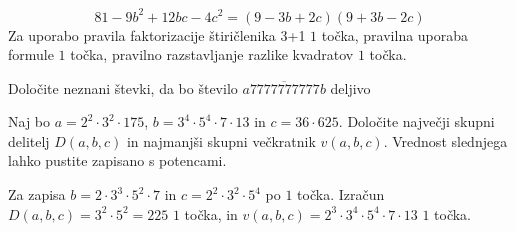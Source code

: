 \documentclass[addpoints]{exam}
\begin{document}
\begin{questions}
\begin{parts}
        \begin{solution}[3cm]
            $$81-9b^2+12bc-4c^2=(9-3b+2c)(9+3b-2c)$$
            Za uporabo pravila faktorizacije štiričlenika 3+1 $1$ točka, pravilna uporaba formule $1$ točka, pravilno razstavljanje razlike kvadratov $1$ točka.
        \end{solution}


    \end{parts}



    \question
    Določite neznani števki, da bo število $\overline{a7777777777b}$ deljivo




    \question[4]
    Naj bo $a=2^2\cdot 3^2\cdot 175$, $b=3^4\cdot 5^4\cdot 7\cdot 13$ in $c=36\cdot 625$. 
    Določite največji skupni delitelj $D(a,b,c)$ in najmanjši skupni večkratnik $v(a,b,c)$. Vrednost slednjega lahko pustite zapisano s potencami.

    \begin{solution}[7cm]
        Za zapisa $b=2\cdot 3^3\cdot 5^2\cdot 7$ in $c=2^2\cdot 3^2\cdot 5^4$ po $1$ točka. 
        Izračun $D(a,b,c)=3^2\cdot 5^2=225$ $1$ točka, in $v(a,b,c)=2^3\cdot 3^4\cdot 5^4\cdot 7\cdot 13$ $1$ točka.
    \end{solution}
    

\end{questions}
\end{document}
